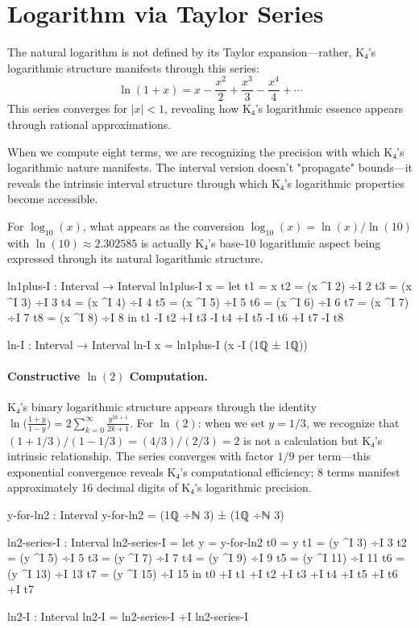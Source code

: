 \documentclass[11pt,a4paper]{book}
\begin{document}
\section{Logarithm via Taylor Series}

The natural logarithm is not defined by its Taylor expansion—rather, K₄'s logarithmic structure manifests through this series:
\[
\ln(1+x) = x - \frac{x^2}{2} + \frac{x^3}{3} - \frac{x^4}{4} + \cdots
\]
This series converges for $|x| < 1$, revealing how K₄'s logarithmic essence appears through rational approximations.

When we compute eight terms, we are recognizing the precision with which K₄'s logarithmic nature manifests. The interval version doesn't "propagate" bounds—it reveals the intrinsic interval structure through which K₄'s logarithmic properties become accessible.

For $\log_{10}(x)$, what appears as the conversion $\log_{10}(x) = \ln(x) / \ln(10)$ with $\ln(10) \approx 2.302585$ is actually K₄'s base-10 logarithmic aspect being expressed through its natural logarithmic structure.

\begin{code}
ln1plus-I : Interval → Interval
ln1plus-I x = 
  let t1 = x
      t2 = (x ^I 2) ÷I 2
      t3 = (x ^I 3) ÷I 3
      t4 = (x ^I 4) ÷I 4
      t5 = (x ^I 5) ÷I 5
      t6 = (x ^I 6) ÷I 6
      t7 = (x ^I 7) ÷I 7
      t8 = (x ^I 8) ÷I 8
  in t1 -I t2 +I t3 -I t4 +I t5 -I t6 +I t7 -I t8

ln-I : Interval → Interval
ln-I x = ln1plus-I (x -I (1ℚ ± 1ℚ))

\end{code}

\paragraph{Constructive $\ln(2)$ Computation.}
K₄'s binary logarithmic structure appears through the identity $\ln\bigl(\frac{1+y}{1-y}\bigr) = 2 \sum_{k=0}^{\infty} \frac{y^{2k+1}}{2k+1}$.
For $\ln(2)$: when we set $y = 1/3$, we recognize that $(1 + 1/3)/(1 - 1/3) = (4/3)/(2/3) = 2$ is not a calculation but K₄'s intrinsic relationship.
The series converges with factor $1/9$ per term—this exponential convergence reveals K₄'s computational efficiency;
8 terms manifest approximately 16 decimal digits of K₄'s logarithmic precision.

\begin{code}
y-for-ln2 : Interval
y-for-ln2 = (1ℚ ÷ℕ 3) ± (1ℚ ÷ℕ 3)

ln2-series-I : Interval
ln2-series-I = 
  let y = y-for-ln2
      t0 = y
      t1 = (y ^I 3) ÷I 3
      t2 = (y ^I 5) ÷I 5
      t3 = (y ^I 7) ÷I 7
      t4 = (y ^I 9) ÷I 9
      t5 = (y ^I 11) ÷I 11
      t6 = (y ^I 13) ÷I 13
      t7 = (y ^I 15) ÷I 15
  in t0 +I t1 +I t2 +I t3 +I t4 +I t5 +I t6 +I t7

ln2-I : Interval
ln2-I = ln2-series-I +I ln2-series-I

\end{code}
\end{document}
